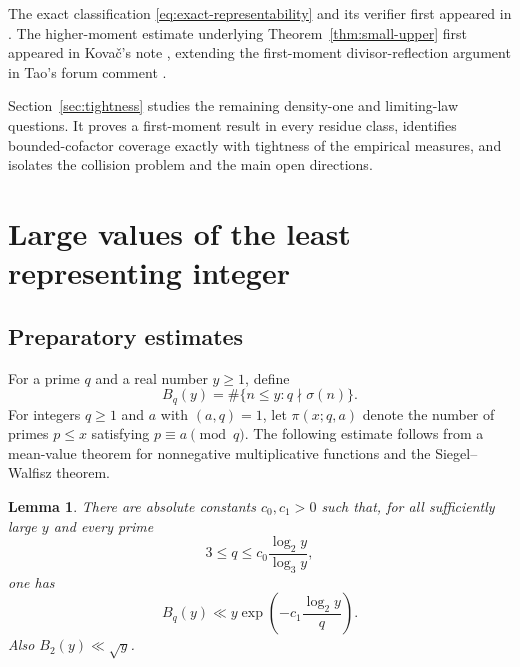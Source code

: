 \documentclass[11pt]{article}
\newtheorem{lemma}[theorem]{Lemma}
\theoremstyle{remark}
\newcommand{\1}{\mathbf 1}
\begin{document}
The exact classification \eqref{eq:exact-representability} and its verifier
first appeared in \cite{jif,jifRepo}.  The higher-moment estimate underlying
Theorem~\ref{thm:small-upper} first appeared in Kova\v{c}'s note \cite{Kovac},
extending the first-moment divisor-reflection argument in Tao's forum comment
\cite{TaoComment}.

Section~\ref{sec:tightness} studies the remaining density-one and limiting-law
questions.  It proves a first-moment result in every residue class, identifies
bounded-cofactor coverage exactly with tightness of the empirical measures,
and isolates the collision problem and the main open directions.

\section{Large values of the least representing integer}\label{sec:large-values}

\subsection{Preparatory estimates}

For a prime $q$ and a real number $y\geq1$, define
\[
 B_q(y)=\#\{n\leq y:q\nmid\sigma(n)\}.
\]
For integers $q\geq1$ and $a$ with $(a,q)=1$, let $\pi(x;q,a)$ denote the
number of primes $p\leq x$ satisfying $p\equiv a\pmod q$.  The following
estimate follows from a mean-value theorem for nonnegative multiplicative
functions and the Siegel--Walfisz theorem.

\begin{lemma}\label{lem:sigma-rate}
There are absolute constants $c_0,c_1>0$ such that, for all sufficiently
large $y$ and every prime
\[
 3\leq q\leq c_0\frac{\log_2 y}{\log_3 y},
\]
one has
\[
 B_q(y)\ll y\exp\!\left(-c_1\frac{\log_2 y}q\right).
\]
Also $B_2(y)\ll\sqrt y$.
\end{lemma}
\end{document}
